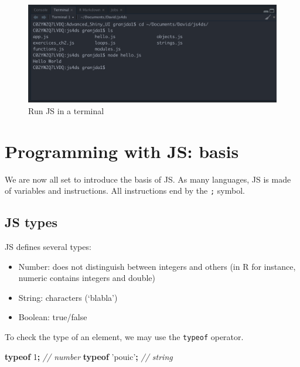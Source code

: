 \documentclass[
]{book}
\newenvironment{Shaded}{\begin{snugshade}}{\end{snugshade}}
\newcommand{\CommentTok}[1]{\textcolor[rgb]{0.56,0.35,0.01}{\textit{#1}}}
\newcommand{\DecValTok}[1]{\textcolor[rgb]{0.00,0.00,0.81}{#1}}
\newcommand{\KeywordTok}[1]{\textcolor[rgb]{0.13,0.29,0.53}{\textbf{#1}}}
\newcommand{\OperatorTok}[1]{\textcolor[rgb]{0.81,0.36,0.00}{\textbf{#1}}}
\newcommand{\StringTok}[1]{\textcolor[rgb]{0.31,0.60,0.02}{#1}}
\providecommand{\tightlist}{%
  \setlength{\itemsep}{0pt}\setlength{\parskip}{0pt}}
\begin{document}
\begin{figure}
\includegraphics[width=26.75in]{images/survival-kit/script-rstudio} \caption{Run JS in a terminal}\label{fig:script-rstudio}
\end{figure}

\hypertarget{programming-with-js-basis}{%
\section{Programming with JS: basis}\label{programming-with-js-basis}}

We are now all set to introduce the basis of JS. As many languages, JS is made of variables and instructions. All instructions end by the \texttt{;} symbol.

\hypertarget{js-types}{%
\subsection{JS types}\label{js-types}}

JS defines several types:

\begin{itemize}
\tightlist
\item
  Number: does not distinguish between integers and others (in R for instance, numeric contains integers and double)
\item
  String: characters (`blabla')
\item
  Boolean: true/false
\end{itemize}

To check the type of an element, we may use the \texttt{typeof} operator.

\begin{Shaded}
\begin{Highlighting}[]
\KeywordTok{typeof} \DecValTok{1}\OperatorTok{;} \CommentTok{// number}
\KeywordTok{typeof} \StringTok{'pouic'}\OperatorTok{;} \CommentTok{// string}
\end{Highlighting}
\end{Shaded}
\end{document}
